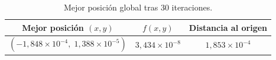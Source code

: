 \begin{table}[H]
\centering
\small
\setlength{\tabcolsep}{6pt}
\renewcommand{\arraystretch}{1.15}
\begin{tabular}{|c|c|c|}
\hline
\rowcolor{encabezado}\textbf{Mejor posición $(x,y)$} & \textbf{$f(x,y)$} & \textbf{Distancia al origen} \\
\hline
$(-1{,}848\times10^{-4},\;1{,}388\times10^{-5})$ & $3{,}434\times10^{-8}$ & $1{,}853\times10^{-4}$ \\
\hline
\end{tabular}
\caption{Mejor posición global tras 30 iteraciones.}
\label{tab:p5b-resumen}
\end{table}
